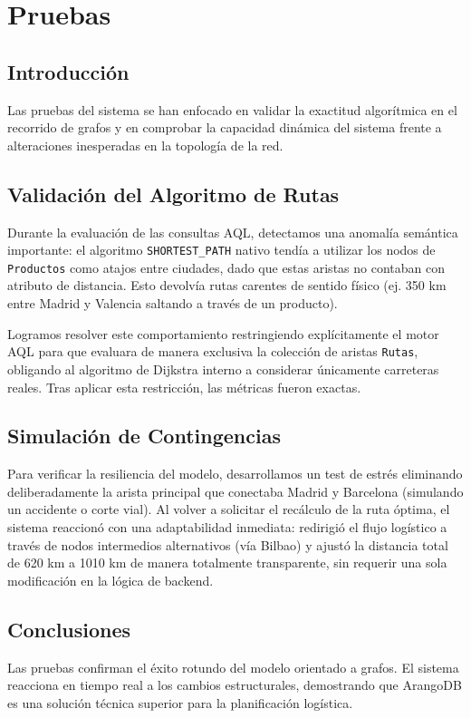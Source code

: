 \chapter{Pruebas}\label{cap:pruebas}

\section{Introducción}
Las pruebas del sistema se han enfocado en validar la exactitud algorítmica en el recorrido de grafos y en comprobar la capacidad dinámica del sistema frente a alteraciones inesperadas en la topología de la red.

\section{Validación del Algoritmo de Rutas}
Durante la evaluación de las consultas AQL, detectamos una anomalía semántica importante: el algoritmo \texttt{SHORTEST\_PATH} nativo tendía a utilizar los nodos de \texttt{Productos} como atajos entre ciudades, dado que estas aristas no contaban con atributo de distancia. Esto devolvía rutas carentes de sentido físico (ej. 350 km entre Madrid y Valencia saltando a través de un producto). 

Logramos resolver este comportamiento restringiendo explícitamente el motor AQL para que evaluara de manera exclusiva la colección de aristas \texttt{Rutas}, obligando al algoritmo de Dijkstra interno a considerar únicamente carreteras reales. Tras aplicar esta restricción, las métricas fueron exactas.

\section{Simulación de Contingencias}
Para verificar la resiliencia del modelo, desarrollamos un test de estrés eliminando deliberadamente la arista principal que conectaba Madrid y Barcelona (simulando un accidente o corte vial). Al volver a solicitar el recálculo de la ruta óptima, el sistema reaccionó con una adaptabilidad inmediata: redirigió el flujo logístico a través de nodos intermedios alternativos (vía Bilbao) y ajustó la distancia total de 620 km a 1010 km de manera totalmente transparente, sin requerir una sola modificación en la lógica de backend.

\section{Conclusiones}
Las pruebas confirman el éxito rotundo del modelo orientado a grafos. El sistema reacciona en tiempo real a los cambios estructurales, demostrando que ArangoDB es una solución técnica superior para la planificación logística.
